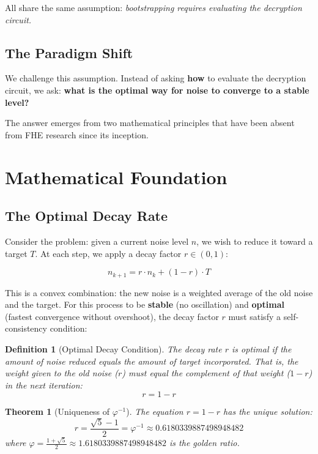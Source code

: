 \documentclass[11pt,a4paper]{article}
\newtheorem{theorem}{Theorem}[section]
\newtheorem{definition}{Definition}[section]
\begin{document}
All share the same assumption: \textit{bootstrapping requires evaluating the decryption circuit.}

\subsection{The Paradigm Shift}

We challenge this assumption. Instead of asking \textbf{how} to evaluate the decryption circuit, we ask: \textbf{what is the optimal way for noise to converge to a stable level?}

The answer emerges from two mathematical principles that have been absent from FHE research since its inception.

\section{Mathematical Foundation}

\subsection{The Optimal Decay Rate}

Consider the problem: given a current noise level $n$, we wish to reduce it toward a target $T$. At each step, we apply a decay factor $r \in (0,1)$:

\begin{equation}
    n_{k+1} = r \cdot n_k + (1-r) \cdot T
\end{equation}

This is a convex combination: the new noise is a weighted average of the old noise and the target. For this process to be \textbf{stable} (no oscillation) and \textbf{optimal} (fastest convergence without overshoot), the decay factor $r$ must satisfy a self-consistency condition:

\begin{definition}[Optimal Decay Condition]
The decay rate $r$ is optimal if the amount of noise reduced equals the amount of target incorporated. That is, the weight given to the old noise ($r$) must equal the complement of that weight ($1-r$) in the next iteration:
\begin{equation}
    r = 1 - r
\end{equation}
\end{definition}

\begin{theorem}[Uniqueness of $\varphi^{-1}$]
The equation $r = 1 - r$ has the unique solution:
\begin{equation}
    r = \frac{\sqrt{5} - 1}{2} = \varphi^{-1} \approx 0.6180339887498948482
\end{equation}
where $\varphi = \frac{1 + \sqrt{5}}{2} \approx 1.6180339887498948482$ is the golden ratio.
\end{theorem}
\end{document}
